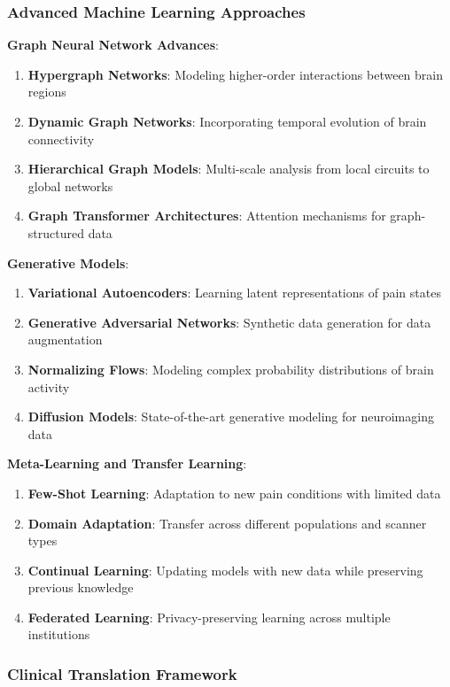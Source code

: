 \subsubsection{Advanced Machine Learning Approaches}

\textbf{Graph Neural Network Advances}:

\begin{enumerate}
\item \textbf{Hypergraph Networks}: Modeling higher-order interactions between brain regions
\item \textbf{Dynamic Graph Networks}: Incorporating temporal evolution of brain connectivity
\item \textbf{Hierarchical Graph Models}: Multi-scale analysis from local circuits to global networks
\item \textbf{Graph Transformer Architectures}: Attention mechanisms for graph-structured data
\end{enumerate}

\textbf{Generative Models}:

\begin{enumerate}
\item \textbf{Variational Autoencoders}: Learning latent representations of pain states
\item \textbf{Generative Adversarial Networks}: Synthetic data generation for data augmentation
\item \textbf{Normalizing Flows}: Modeling complex probability distributions of brain activity
\item \textbf{Diffusion Models}: State-of-the-art generative modeling for neuroimaging data
\end{enumerate}

\textbf{Meta-Learning and Transfer Learning}:

\begin{enumerate}
\item \textbf{Few-Shot Learning}: Adaptation to new pain conditions with limited data
\item \textbf{Domain Adaptation}: Transfer across different populations and scanner types
\item \textbf{Continual Learning}: Updating models with new data while preserving previous knowledge
\item \textbf{Federated Learning}: Privacy-preserving learning across multiple institutions
\end{enumerate}

\subsubsection{Clinical Translation Framework}

